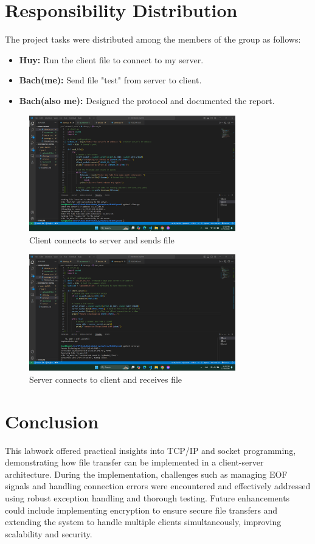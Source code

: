 \documentclass{article}
\begin{document}
\section{Responsibility Distribution}
The project tasks were distributed among the members of the group as follows:
\begin{itemize}
    \item \textbf{Huy:} Run the client file to connect to my server.
    \item \textbf{Bach(me):} Send file "test" from server to client.
    \item \textbf{Bach(also me):} Designed the protocol and documented the report.
\end{itemize}

\begin{figure}[h!]
    \centering
    \includegraphics[width=0.8\textwidth]{Connection_client.png} %
    \caption{Client connects to server and sends file}
    \label{fig:client}
\end{figure}
\clearpage
\begin{figure}[h!]
    \centering
    \includegraphics[width=0.8\textwidth]{Connection_server.png} %
    \caption{Server connects to client and receives file}
    \label{fig:server}
\end{figure}

\section{Conclusion}
This labwork offered practical insights into TCP/IP and socket programming, demonstrating how file transfer can be implemented in a client-server architecture. During the implementation, challenges such as managing EOF signals and handling connection errors were encountered and effectively addressed using robust exception handling and thorough testing. Future enhancements could include implementing encryption to ensure secure file transfers and extending the system to handle multiple clients simultaneously, improving scalability and security.
\end{document}
